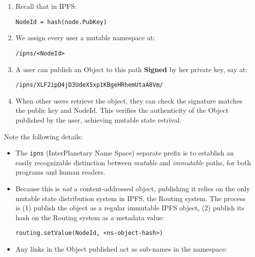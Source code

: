\documentclass{sig-alternate}
\begin{document}
\begin{enumerate}
  \item  Recall that in IPFS:

\begin{verbatim}
NodeId = hash(node.PubKey)
\end{verbatim}

  \item We assign every user a mutable namespace at:

\begin{verbatim}
/ipns/<NodeId>
\end{verbatim}

  \item A user can publish an Object to this path \textbf{Signed} by her private key, say at:

\begin{verbatim}
/ipns/XLF2ipQ4jD3UdeX5xp1KBgeHRhemUtaA8Vm/
\end{verbatim}

  \item When other users retrieve the object, they can check the signature matches the public key and NodeId. This verifies the authenticity of the Object published by the user, achieving mutable state retrival.

\end{enumerate}

Note the following details:

\begin{itemize}
  \item The \texttt{ipns} (InterPlanetary Name Space) separate prefix is to establish an easily recognizable distinction between \textit{mutable} and \textit{immutable} paths, for both programs and human readers.

  \item Because this is \textit{not} a content-addressed object, publishing it relies on the only mutable state distribution system in IPFS, the Routing system. The process is (1) publish the object as a regular immutable IPFS object, (2) publish its hash on the Routing system as a metadata value:

\begin{verbatim}
routing.setValue(NodeId, <ns-object-hash>)
\end{verbatim}

  \item Any links in the Object published act as sub-names in the namespace:
\end{itemize}
\end{document}
